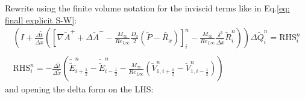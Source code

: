 \documentclass[11pt, a4paper]{article}
\begin{document}
Rewrite using the finite volume notation for the inviscid terms like in Eq.\ref{eq: finall explicit S-W}:
\begin{equation}
    \begin{array}{c}
        \displaystyle\left(I+\frac{\Delta\tilde{t}}{\Delta\tilde{x}}\left(\left[\nabla\tilde{A}^{+}+\Delta\tilde{A}^{-}-\frac{M_\infty}{Re_{L\infty}}\frac{D_0}{2}\left(\tilde{P}-\tilde{R_x}\right)\right]_i^n-\frac{M_\infty}{Re_{L\infty}}\frac{\delta^2}{\Delta\tilde{x}}\tilde{R}_i^n\right)\right)\Delta\tilde{Q}_i^n=\mathrm{RHS}_i^n \\\\
        \mathrm{RHS}_i^n=\displaystyle-\frac{\Delta\tilde{t}}{\Delta\tilde{x}}\left(\tilde{\tilde{E}}_{i+\frac{1}{2}}^n-\tilde{\tilde{E}}_{i-\frac{1}{2}}^n-\frac{M_\infty}{Re_{L\infty}}\left(\tilde{V}_{1,i+\frac{1}{2}}^{n}-\tilde{V}_{1,i-\frac{1}{2}}^{n}\right)\right)
    \end{array}
\end{equation}
and opening the delta form on the LHS:
\end{document}
